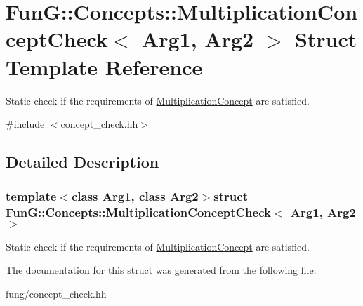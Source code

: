 \hypertarget{structFunG_1_1Concepts_1_1MultiplicationConceptCheck}{\section{Fun\-G\-:\-:Concepts\-:\-:Multiplication\-Concept\-Check$<$ Arg1, Arg2 $>$ Struct Template Reference}
\label{structFunG_1_1Concepts_1_1MultiplicationConceptCheck}
}


Static check if the requirements of \hyperlink{structFunG_1_1Concepts_1_1MultiplicationConcept}{Multiplication\-Concept} are satisfied.  




{\ttfamily \#include $<$concept\-\_\-check.\-hh$>$}



\subsection{Detailed Description}
\subsubsection*{template$<$class Arg1, class Arg2$>$struct Fun\-G\-::\-Concepts\-::\-Multiplication\-Concept\-Check$<$ Arg1, Arg2 $>$}

Static check if the requirements of \hyperlink{structFunG_1_1Concepts_1_1MultiplicationConcept}{Multiplication\-Concept} are satisfied. 

The documentation for this struct was generated from the following file\-:\begin{DoxyCompactItemize}
\item 
fung/concept\-\_\-check.\-hh\end{DoxyCompactItemize}
